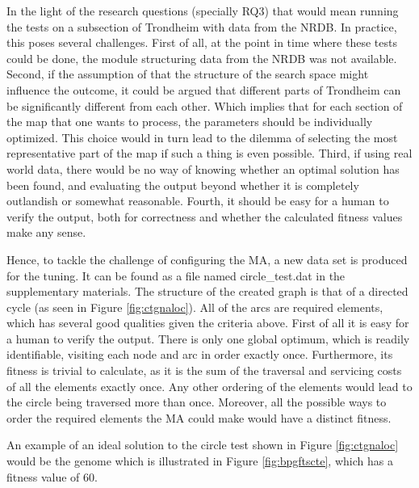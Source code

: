 In the light of the research questions (specially RQ3) that would mean running the tests on a subsection of Trondheim with data from the NRDB. In practice, this poses several challenges. First of all, at the point in time where these tests could be done, the module structuring data from the NRDB was not available. Second, if the assumption of that the structure of the search space might influence the outcome, it could be argued that different parts of Trondheim can be significantly different from each other. Which implies that for each section of the map that one wants to process, the parameters should be individually optimized. This choice would in turn lead to the dilemma of selecting the most representative part of the map if such a thing is even possible. Third, if using real world data, there would be no way of knowing whether an optimal solution has been found, and evaluating the output beyond whether it is completely outlandish or somewhat reasonable. Fourth, it should be easy for a human to verify the output, both for correctness and whether the calculated fitness values make any sense.

Hence, to tackle the challenge of configuring the MA, a new data set is produced for the tuning. It can be found as a file named circle\_test.dat in the supplementary materials. The structure of the created graph is that of a directed cycle (as seen in Figure \ref{fig:ctgnaloc}). All of the arcs are required elements, which has several good qualities given the criteria above. First of all it is easy for a human to verify the output. There is only one global optimum, which is readily identifiable, visiting each node and arc in order exactly once. Furthermore, its fitness is trivial to calculate, as it is the sum of the traversal and servicing costs of all the elements exactly once. Any other ordering of the elements would lead to the circle being traversed more than once. Moreover, all the possible ways to order the required elements the MA could make would have a distinct fitness.

An example of an ideal solution to the circle test shown in Figure \ref{fig:ctgnaloc} would be the genome which is illustrated in Figure \ref{fig:bpgftscte}, which has a fitness value of 60.

